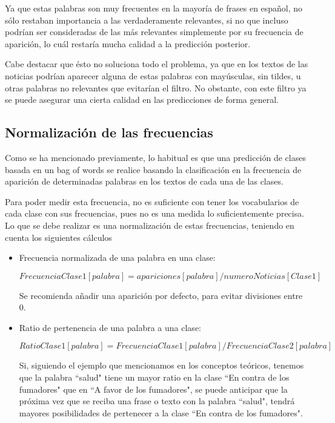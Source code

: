 Ya que estas palabras son muy frecuentes en la mayoría de frases en español, no sólo restaban importancia a las verdaderamente relevantes, si no que incluso podrían ser consideradas de las más relevantes simplemente por su frecuencia de aparición, lo cuál restaría mucha calidad a la predicción posterior. 

Cabe destacar que ésto no soluciona todo el problema, ya que en los textos de las noticias podrían aparecer alguna de estas palabras con mayúsculas, sin tildes, u otras palabras no relevantes que evitarían el filtro. No obstante, con este filtro ya se puede asegurar una cierta calidad en las predicciones de forma general.

\subsection{Normalización de las frecuencias}

Como se ha mencionado previamente, lo habitual es que una predicción de clases basada en un bag of words se realice basando la clasificación en la frecuencia de aparición de determinadas palabras en los textos de cada una de las clases.

Para poder medir esta frecuencia, no es suficiente con tener los vocabularios de cada clase con sus frecuencias, pues no es una medida lo suficientemente precisa. Lo que se debe realizar es una normalización de estas frecuencias, teniendo en cuenta los siguientes cálculos \cite{spamtutorial}

\begin{itemize}

\item Frecuencia normalizada de una palabra en una clase:

\[ FrecuenciaClase1[palabra] = apariciones[palabra] / numeroNoticias[Clase1] \]

Se recomienda añadir una aparición por defecto, para evitar divisiones entre 0.

\item Ratio de pertenencia de una palabra a una clase:

\[ RatioClase1[palabra] = FrecuenciaClase1[palabra] / FrecuenciaClase2[palabra] \]

Si, siguiendo el ejemplo que mencionamos en los conceptos teóricos, tenemos que la palabra ``salud" tiene un mayor ratio en la clase ``En contra de los fumadores" que en ``A favor de los fumadores", se puede anticipar que la próxima vez que se reciba una frase o texto con la palabra ``salud", tendrá mayores posibilidades de pertenecer a la clase ``En contra de los fumadores".

\end{itemize}

